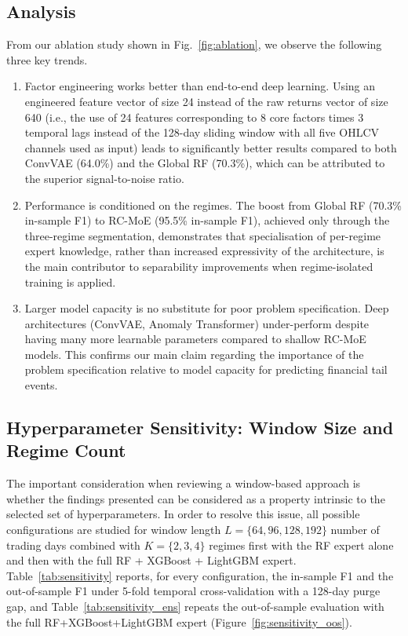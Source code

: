 \documentclass[]{interact}
\newcommand{\rev}[1]{#1}
\begin{document}
\subsection{Analysis}
\label{subsec:ablation_analysis}

From our ablation study shown in Fig.~\ref{fig:ablation}, we observe the following three key trends.

\begin{enumerate}
    \item Factor engineering works better than end-to-end deep learning.
    Using an engineered feature vector of size 24 instead of the raw returns vector of size 640 (i.e., the use of 24 features corresponding to 8 core factors times 3 temporal lags instead of the 128-day sliding window with all five OHLCV channels used as input) leads to significantly better results compared to both ConvVAE (64.0\%) and the Global RF (70.3\%), which can be attributed to the superior signal-to-noise ratio.

    \item Performance is conditioned on the regimes.
    The boost from Global RF (70.3\% in-sample F1) to RC-MoE (95.5\% in-sample F1), achieved only through the three-regime segmentation, demonstrates that specialisation of per-regime expert knowledge, rather than increased expressivity of the architecture, is the main contributor to separability improvements when regime-isolated training is applied.

    \item Larger model capacity is no substitute for poor problem specification.
    Deep architectures (ConvVAE, Anomaly Transformer) under-perform despite having many more learnable parameters compared to shallow RC-MoE models. This confirms our main claim regarding the importance of the problem specification relative to model capacity for predicting financial tail events.
\end{enumerate}

\subsection{Hyperparameter Sensitivity: Window Size and Regime Count}
\label{subsec:sensitivity}

The important consideration when reviewing a window-based approach is whether the findings presented can be considered as a property intrinsic to the selected set of hyperparameters. In order to resolve this issue, all possible configurations are studied for window length $L = \{64, 96, 128, 192\}$ number of trading days combined with $K = \{2, 3, 4\}$ regimes first with the RF expert alone and then with the full RF + XGBoost + LightGBM expert. Table~\ref{tab:sensitivity} reports, for every configuration, the in-sample F1 and the out-of-sample F1 under 5-fold temporal cross-validation with a 128-day purge gap, and Table~\ref{tab:sensitivity_ens} repeats the out-of-sample evaluation with the full RF+XGBoost+LightGBM expert\rev{ (Figure~\ref{fig:sensitivity_oos})}.
\end{document}
